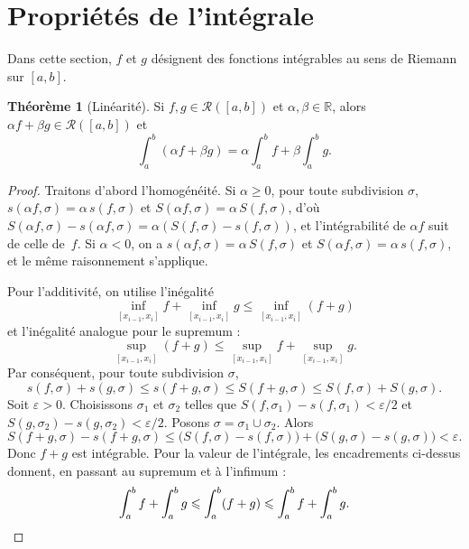 \documentclass[12pt,a4paper,openany]{book}
\theoremstyle{definition}
\newtheorem{theoreme}{Théorème}[chapter]
\newcommand{\R}{\mathbb{R}}
\newcommand{\eps}{\varepsilon}
\begin{document}
\section{Propriétés de l'intégrale}
\label{sec:proprietes-integrale}

Dans cette section, $f$ et $g$ désignent des fonctions intégrables au sens de Riemann sur $[a,b]$.

\begin{theoreme}[Linéarité]\label{thm:linearite}
  Si $f, g \in \mathcal{R}([a,b])$ et $\alpha, \beta \in \R$, alors $\alpha f + \beta g \in \mathcal{R}([a,b])$ et
  \[
    \int_a^b (\alpha f + \beta g) = \alpha \int_a^b f + \beta \int_a^b g.
  \]
\end{theoreme}

\begin{proof}
  Traitons d'abord l'homogénéité. Si $\alpha \geqslant 0$, pour toute subdivision $\sigma$, $s(\alpha f, \sigma) = \alpha\, s(f, \sigma)$ et $S(\alpha f, \sigma) = \alpha\, S(f, \sigma)$, d'où $S(\alpha f,\sigma) - s(\alpha f, \sigma) = \alpha(S(f,\sigma) - s(f,\sigma))$, et l'intégrabilité de $\alpha f$ suit de celle de~$f$. Si $\alpha < 0$, on a $s(\alpha f, \sigma) = \alpha\, S(f, \sigma)$ et $S(\alpha f, \sigma) = \alpha\, s(f, \sigma)$, et le même raisonnement s'applique.

  Pour l'additivité, on utilise l'inégalité
  \[
    \inf_{[x_{i-1},x_i]} f + \inf_{[x_{i-1},x_i]} g \leqslant \inf_{[x_{i-1},x_i]} (f+g)
  \]
  et l'inégalité analogue pour le supremum :
  \[
    \sup_{[x_{i-1},x_i]}(f+g) \leqslant \sup_{[x_{i-1},x_i]} f + \sup_{[x_{i-1},x_i]} g.
  \]
  Par conséquent, pour toute subdivision $\sigma$,
  \[
    s(f,\sigma) + s(g,\sigma) \leqslant s(f+g,\sigma) \leqslant S(f+g,\sigma) \leqslant S(f,\sigma) + S(g,\sigma).
  \]
  Soit $\eps > 0$. Choisissons $\sigma_1$ et $\sigma_2$ telles que $S(f,\sigma_1) - s(f,\sigma_1) < \eps/2$ et $S(g,\sigma_2) - s(g,\sigma_2) < \eps/2$. Posons $\sigma = \sigma_1 \cup \sigma_2$. Alors
  \[
    S(f+g,\sigma) - s(f+g,\sigma) \leqslant \bigl(S(f,\sigma) - s(f,\sigma)\bigr) + \bigl(S(g,\sigma) - s(g,\sigma)\bigr) < \eps.
  \]
  Donc $f + g$ est intégrable. Pour la valeur de l'intégrale, les encadrements ci-dessus donnent, en passant au supremum et à l'infimum :
  \[
    \int_a^b f + \int_a^b g \leqslant \int_a^b(f+g) \leqslant \int_a^b f + \int_a^b g. \qedhere
  \]
\end{proof}
\end{document}
